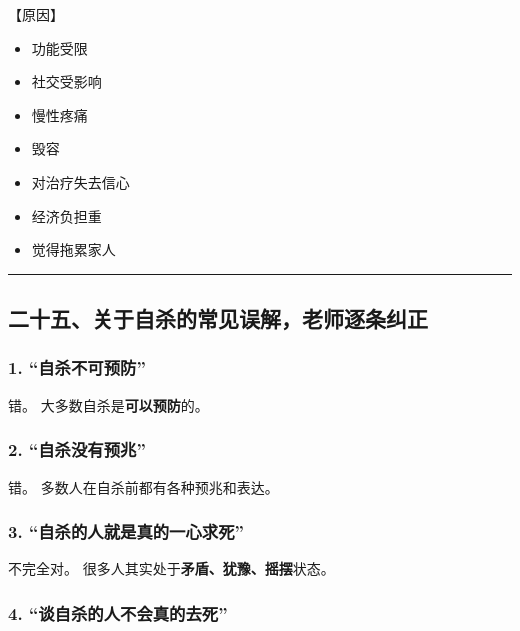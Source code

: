 \documentclass[
  chinese,
  9pt,
  a4paper,
]{ctexart}
\providecommand{\tightlist}{%
  \setlength{\itemsep}{0pt}\setlength{\parskip}{0pt}}
\begin{document}
【原因】

\begin{itemize}
\tightlist
\item
  功能受限
\item
  社交受影响
\item
  慢性疼痛
\item
  毁容
\item
  对治疗失去信心
\item
  经济负担重
\item
  觉得拖累家人
\end{itemize}

\begin{center}\rule{0.5\linewidth}{0.5pt}\end{center}

\subsection{二十五、关于自杀的常见误解，老师逐条纠正}\label{ux4e8cux5341ux4e94ux5173ux4e8eux81eaux6740ux7684ux5e38ux89c1ux8befux89e3ux8001ux5e08ux9010ux6761ux7ea0ux6b63}

\subsubsection{1.
``自杀不可预防''}\label{ux81eaux6740ux4e0dux53efux9884ux9632}

错。 大多数自杀是\textbf{可以预防}的。

\subsubsection{2.
``自杀没有预兆''}\label{ux81eaux6740ux6ca1ux6709ux9884ux5146}

错。 多数人在自杀前都有各种预兆和表达。

\subsubsection{3.
``自杀的人就是真的一心求死''}\label{ux81eaux6740ux7684ux4ebaux5c31ux662fux771fux7684ux4e00ux5fc3ux6c42ux6b7b}

不完全对。 很多人其实处于\textbf{矛盾、犹豫、摇摆}状态。

\subsubsection{4.
``谈自杀的人不会真的去死''}\label{ux8c08ux81eaux6740ux7684ux4ebaux4e0dux4f1aux771fux7684ux53bbux6b7b}
\end{document}

